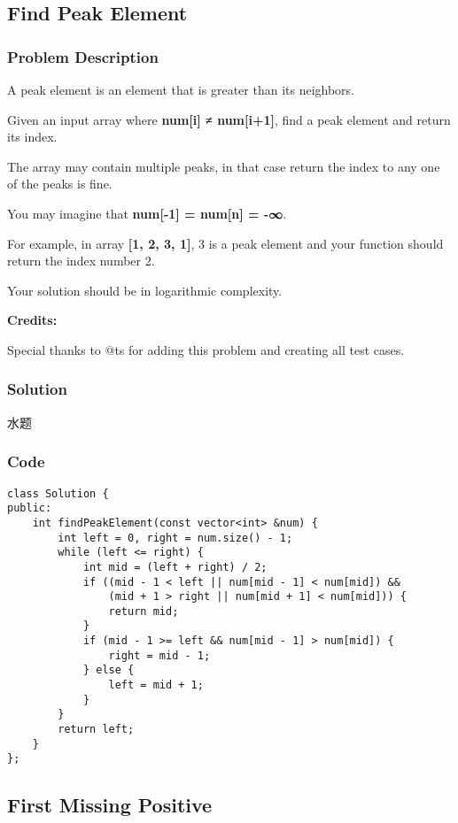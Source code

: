 \documentclass[courier]{article}
\begin{document}
\begin{CJK*}{UTF8}{gkai}
\subsection{ Find Peak Element }

\subsubsection*{Problem Description}
A peak element is an element that is greater than its neighbors.

Given an input array where \textbf{num[i] ≠ num[i+1]}, find a peak element and return its index.

The array may contain multiple peaks, in that case return the index to any one of the peaks is fine.

You may imagine that \textbf{num[-1] = num[n] = -∞}.

For example, in array \textbf{[1, 2, 3, 1]}, 3 is a peak element and your function should return the index number 2.

Your solution should be in logarithmic complexity.

\textbf{Credits:}

Special thanks to @ts for adding this problem and creating all test cases.



\subsubsection*{Solution}
水题

\subsubsection*{Code}
\begin{lstlisting}
class Solution {
public:
    int findPeakElement(const vector<int> &num) {
        int left = 0, right = num.size() - 1;
        while (left <= right) {
            int mid = (left + right) / 2;
            if ((mid - 1 < left || num[mid - 1] < num[mid]) &&
                (mid + 1 > right || num[mid + 1] < num[mid])) {
                return mid;
            }
            if (mid - 1 >= left && num[mid - 1] > num[mid]) {
                right = mid - 1;
            } else {
                left = mid + 1;
            }
        }
        return left;
    }
}; 
\end{lstlisting}


\subsection{ First Missing Positive }


\end{CJK*}
\end{document}

